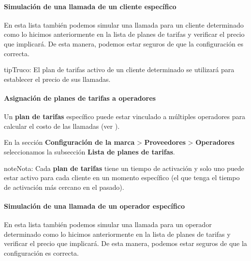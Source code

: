 \documentclass[letterpaper,10pt,spanish]{sphinxmanual}
\begin{document}
\paragraph{Simulación de una llamada de un cliente específico}

En esta lista también podemos simular una llamada para un cliente determinado como lo hicimos anteriormente en la lista de planes de tarifas y verificar el precio que implicará. De esta manera, podemos estar seguros de que la configuración es correcta.

\begin{notice}{tip}{Truco:}
El plan de tarifas activo de un cliente determinado se utilizará para establecer el precio de sus llamadas.
\end{notice}


\paragraph{Asignación de planes de tarifas a operadores}
\label{administration_portal/brand/billing/rating_plans:assigning-rating-plans-to-carriers}\label{administration_portal/brand/billing/rating_plans:id3}
Un \textbf{plan de tarifas} específico puede estar vinculado a múltiples operadores para calcular el costo de las llamadas (ver {\hyperref[administration_portal/brand/providers/carriers:cost\string-calculation]{}}).

En la sección \textbf{Configuración de la marca} \textgreater{} \textbf{Proveedores} \textgreater{} \textbf{Operadores} seleccionamos la subsección \textbf{Lista de planes de tarifas}.

\begin{notice}{note}{Nota:}
Cada \textbf{plan de tarifas} tiene un tiempo de activación y solo uno puede estar activo para cada cliente en un momento específico (el que tenga el tiempo de activación más cercano en el pasado).
\end{notice}
\paragraph{Simulación de una llamada de un operador específico}

En esta lista también podemos simular una llamada para un operador determinado como lo hicimos anteriormente en la lista de planes de tarifas y verificar el precio que implicará. De esta manera, podemos estar seguros de que la configuración es correcta.
\end{document}
